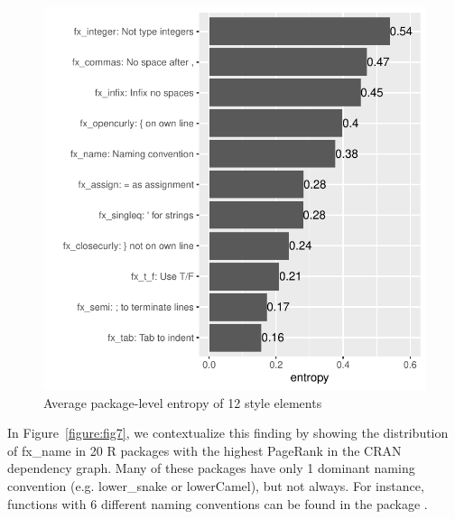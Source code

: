 \begin{figure}[htbp]
  \centering
  \includegraphics{fig6}
  \caption{Average package-level entropy of 12 style elements}
  \label{figure:fig6}
\end{figure}

In Figure~\ref{figure:fig7}, we contextualize this finding by showing the distribution of fx\_name in 20 R packages with the highest PageRank \citep{page1999pagerank} in the CRAN dependency graph. Many of these packages have only 1 dominant naming convention (e.g. lower\_snake or lowerCamel), but not always. For instance, functions with 6 different naming conventions can be found in the package .

